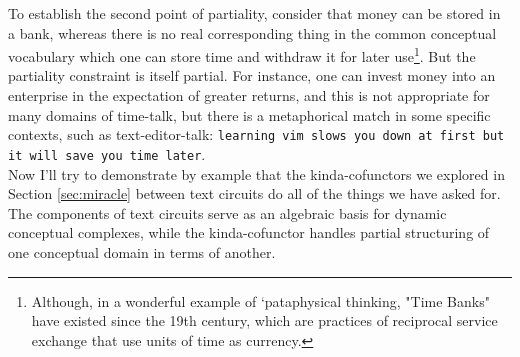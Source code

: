 To establish the second point of partiality, consider that money can be stored in a bank, whereas there is no real corresponding thing in the common conceptual vocabulary which one can store time and withdraw it for later use\footnote{Although, in a wonderful example of `pataphysical thinking, "Time Banks" have existed since the 19th century, which are practices of reciprocal service exchange that use units of time as currency.}. But the partiality constraint is itself partial. For instance, one can invest money into an enterprise in the expectation of greater returns, and this is not appropriate for many domains of time-talk, but there is a metaphorical match in some specific contexts, such as text-editor-talk: \texttt{learning vim slows you down at first but it will save you time later}.\\

Now I'll try to demonstrate by example that the kinda-cofunctors we explored in Section \ref{sec:miracle} between text circuits do all of the things we have asked for. The components of text circuits serve as an algebraic basis for dynamic conceptual complexes, while the kinda-cofunctor handles partial structuring of one conceptual domain in terms of another.

